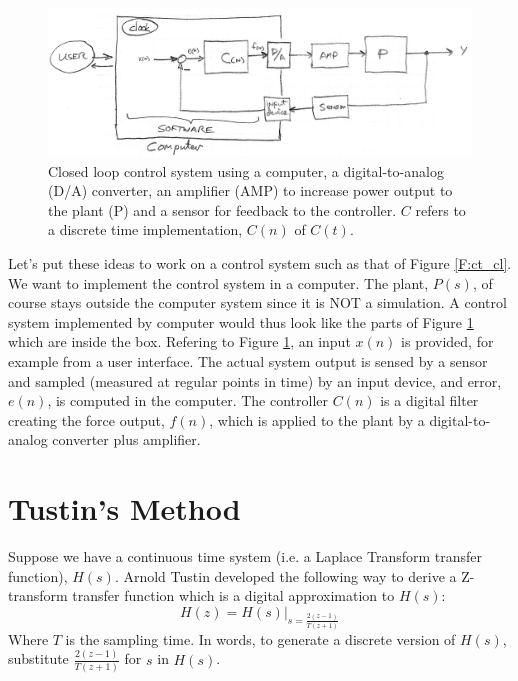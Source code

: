 \begin{figure}\centering
\includegraphics[width=6.00in]{figs11/01106.png}
\caption{Closed loop   control system using a computer, a digital-to-analog (D/A) converter, an amplifier (AMP) to increase power output to the plant (P) and a sensor for feedback to the controller.  $C$ refers to a discrete time implementation, $C(n)$ of $C(t)$.}\label{F:dt_cl}
\end{figure}



Let's put these ideas to work on  a control system such as that of Figure \ref{F:ct_cl}.
We want to implement the control system in a computer.
The plant, $P(s)$, of course stays outside the computer system since it is NOT a simulation.
A control system implemented by computer would thus look like the parts of Figure \ref{F:dt_cl} which are inside the box.
Refering to  Figure \ref{F:dt_cl}, an input $x(n)$  is provided, for example from a user interface.  The actual system output is sensed by a sensor  and sampled (measured at regular points in time) by an input device, and error, $e(n)$, is computed in the computer.  The controller $C(n)$ is a digital filter creating the force output, $f(n)$, which is applied to the plant by a digital-to-analog converter plus amplifier.


\section{Tustin's Method}

Suppose we have a continuous time system (i.e. a Laplace Transform transfer function), $H(s)$.   Arnold Tustin developed
the following way to derive a Z-transform transfer function which is a digital approximation
to $H(s)$:
\[
H(z) = H(s)|_{s=\frac{2(z-1)}{T(z+1)}}
\]
Where $T$ is the sampling time.
In words,  to generate a discrete version of $H(s)$,  substitute ${\frac{2(z-1)}{T(z+1)}}$ for $s$ in $H(s)$.


